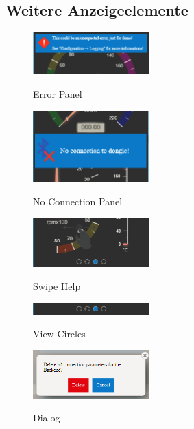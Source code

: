 \pagebreak

\subsection{Weitere Anzeigeelemente}
\label{sec:appAnzeigeelemente}

\begin{figure}
  \begin{center}
	\includegraphics[width=0.4\textwidth]{./img/App_ErrorPanel}
	\caption{Error Panel}
	\label{fig:App_ErrorPanel}
	\includegraphics[width=0.4\textwidth]{./img/App_NoConnectionPanel}
	\caption{No Connection Panel}
	\label{fig:App_NoConnectionPanel}
    \includegraphics[width=0.4\textwidth]{./img/App_SwipeHelp}
    \caption{Swipe Help}
    \label{fig:App_SwipeHelp}
    \includegraphics[width=0.4\textwidth]{./img/App_ViewCircles}
    \caption{View Circles}
    \label{fig:App_ViewCircles}
    \includegraphics[width=0.4\textwidth]{./img/App_Dialog}
    \caption{Dialog}
    \label{fig:App_Dialog}
  \end{center}
\end{figure}

